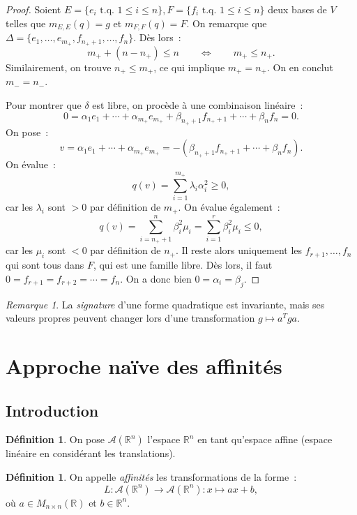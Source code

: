 \documentclass{article}
\newcommand{\R}{\mathbb R}
\newcommand{\M}[3]{M_{#1 \times #2}(#3)}
\newcommand{\tq}{\textrm{ t.q. }}
\theoremstyle{definition}
\newtheorem{déf}[thm]{Définition}
\theoremstyle{remark}
\newtheorem*{rmq}{Remarque}
\begin{document}
\begin{proof}
		Soient $E = \{e_i \tq 1 \leq i \leq n\}, F = \{f_i \tq 1 \leq i \leq n\}$ deux bases de $V$ telles que $m_{E, E}(q) = g$ et $m_{F, F}(q) = F$.
		On remarque que $\Delta = \{e_1, \dotsc, e_{m_+}, f_{n_++1}, \dotsc, f_n\}$. Dès lors~:
		\[m_+ + (n-n_+) \leq n \qquad\iff\qquad m_+ \leq n_+.\]
		Similairement, on trouve $n_+ \leq m_+$, ce qui implique $m_+ = n_+$. On en conclut $m_- = n_-$.

		Pour montrer que $\delta$ est libre, on procède à une combinaison linéaire~:
		\[0 = \alpha_1e_1 + \dotsb + \alpha_{m_+}e_{m_+} + \beta_{n_++1}f_{n_++1} + \dotsb + \beta_nf_n = 0.\]
		On pose~:
		\[v = \alpha_1e_1 + \dotsb + \alpha_{m_+}e_{m_+} = -\left(\beta_{n_++1}f_{n_++1} + \dotsb + \beta_nf_n\right).\]
		On évalue~:
		\[q(v) = \sum_{i=1}^{m_+}\lambda_i\alpha_i^2 \geq 0,\]
		car les $\lambda_i$ sont $> 0$ par définition de $m_+$. On évalue également~:
		\[q(v) = \sum_{i=n_++1}^n \beta_i^2\mu_i = \sum_{i=1}^r\beta_i^2\mu_i \leq 0,\]
		car les $\mu_i$ sont $< 0$ par définition de $n_+$. Il reste alors uniquement les $f_{r+1}, \dotsc, f_n$ qui sont tous dans $F$, qui est une famille
		libre. Dès lors, il faut $0 = f_{r+1} = f_{r+2} = \dotsb = f_n$. On a donc bien $0 = \alpha_i = \beta_j$.
		\end{proof}

		\begin{rmq} La \emph{signature} d'une forme quadratique est invariante, mais ses valeurs propres peuvent changer lors d'une transformation
		$g \mapsto a^Tga$.
		\end{rmq}

\newpage
\section{Approche naïve des affinités}
	\subsection{Introduction}
		\begin{déf} On pose $\mathcal A(\R^n)$ l'espace $\R^n$ en tant qu'espace affine (espace linéaire en considérant les translations).
		\end{déf}

		\begin{déf} On appelle \emph{affinités} les transformations de la forme~:
		\[L : \mathcal A(\R^n) \to \mathcal A(\R^n) : x \mapsto ax + b,\]
		où $a \in \M nn\R$ et $b \in \R^n$.
		\end{déf}
\end{document}
